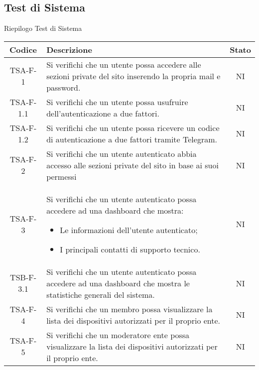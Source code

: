	\subsection{Test di Sistema}
		\begin{center}
		Riepilogo Test di Sistema
			\begin{longtable}{|c|p{10cm}|c|}
			\hline
			\rowcolor{lighter-grayer}
			\textbf{Codice} & \textbf{Descrizione} & \textbf{Stato}  \\ %

			\hline
			\endhead

	
			\hline
			 TSA-F-1 & Si verifichi che un utente possa accedere alle sezioni private del sito inserendo la propria mail e password.
			  & NI \\
			 \hline
			 TSA-F-1.1 & Si verifichi che un utente possa usufruire dell'autenticazione a due fattori. & NI \\
			 \hline
			 TSA-F-1.2 & Si verifichi che un utente possa ricevere un codice di autenticazione a due fattori tramite Telegram. & NI \\
			 \hline
			 TSA-F-2 & Si verifichi che un utente autenticato abbia accesso alle sezioni private del sito in base ai suoi permessi & NI \\
			 \hline
			 TSA-F-3 & Si verifichi che un utente autenticato possa accedere ad una dashboard che mostra:
			 \begin{itemize}
			 	\item Le informazioni dell'utente autenticato;
			 	\item I principali contatti di supporto tecnico.
			 \end{itemize} & NI \\
			 \hline
			 TSB-F-3.1 & Si verifichi che un utente autenticato possa accedere ad una dashboard che mostra le statistiche generali del sistema. & NI \\
			 \hline
			 TSA-F-4 & Si verifichi che un membro possa visualizzare la lista dei dispositivi autorizzati per il proprio ente. & NI \\
			 \hline
			 TSA-F-5 & Si verifichi che un moderatore ente possa visualizzare la lista dei dispositivi autorizzati per il proprio ente. & NI \\

\end{longtable}
\end{center}
